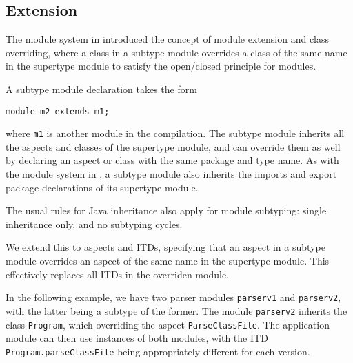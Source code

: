 \subsection{Extension}

The module system in \cite{modulesastypes} introduced the concept of
module extension and class overriding, where a class in a subtype module
overrides a class of the same name in the supertype module to satisfy the 
open/closed principle for modules.

A subtype module declaration takes the form
\begin{lstlisting}
module m2 extends m1;
\end{lstlisting}
where \texttt{m1} is another module in the compilation. The subtype module
inherits all the aspects and classes of the supertype module, and can override
them as well by declaring an aspect or class with the same package and type name.
As with the module system in \cite{modulesastypes}, a subtype module also inherits
the imports and export package declarations of its supertype module.

The usual rules for Java inheritance also apply for module subtyping: single 
inheritance only, and no subtyping cycles.

We extend this to aspects and ITDs, specifying that an aspect in a subtype module
overrides an aspect of the same name in the supertype module. This effectively
replaces all ITDs in the overriden module.

In the following example, we have two parser modules \texttt{parserv1} and \texttt{parserv2},
with the latter being a subtype of the former. The module \texttt{parserv2} inherits
the class \texttt{Program}, which overriding the aspect \texttt{ParseClassFile}. The
application module can then use instances of both modules, with the ITD \texttt{Program.parseClassFile}
being appropriately different for each version.

